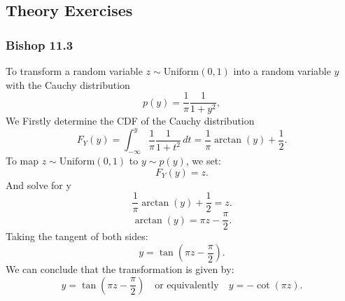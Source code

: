 \subsection{Theory Exercises}

\subsubsection*{Bishop 11.3}

To transform a random variable \( z \sim \text{Uniform}(0, 1) \) into a random variable \( y \) with the Cauchy distribution 
\[
p(y) = \frac{1}{\pi} \frac{1}{1 + y^2},
\]
We Firstly determine the CDF of the Cauchy distribution
\[
F_Y(y) = \int_{-\infty}^y \frac{1}{\pi} \frac{1}{1 + t^2} \, dt = \frac{1}{\pi} \arctan(y) + \frac{1}{2}.
\]
To map \( z \sim \text{Uniform}(0, 1) \) to \( y \sim p(y) \), we set:
\[
F_Y(y) = z.
\]
And solve for y
\[
\frac{1}{\pi} \arctan(y) + \frac{1}{2} = z.
\]
\[
\arctan(y) = \pi z - \frac{\pi}{2}.
\]
Taking the tangent of both sides:
\[
y = \tan\left(\pi z - \frac{\pi}{2}\right).
\]
We can conclude that the transformation is given by:
\[
y = \tan\left(\pi z - \frac{\pi}{2}\right) \quad \text{or equivalently} \quad y = -\cot(\pi z).
\]


